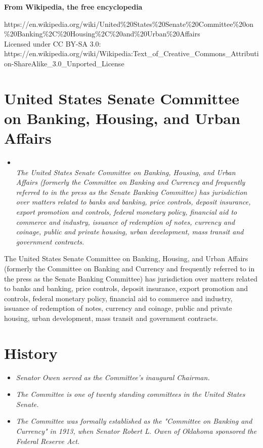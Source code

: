 \textbf{From Wikipedia, the free encyclopedia}

https://en.wikipedia.org/wiki/United\%20States\%20Senate\%20Committee\%20on\%20Banking\%2C\%20Housing\%2C\%20and\%20Urban\%20Affairs\\
Licensed under CC BY-SA 3.0:\\
https://en.wikipedia.org/wiki/Wikipedia:Text\_of\_Creative\_Commons\_Attribution-ShareAlike\_3.0\_Unported\_License

\section{United States Senate Committee on Banking, Housing, and Urban
Affairs}\label{united-states-senate-committee-on-banking-housing-and-urban-affairs}

\begin{itemize}
\item
  \emph{\\
  The United States Senate Committee on Banking, Housing, and Urban
  Affairs (formerly the Committee on Banking and Currency and frequently
  referred to in the press as the Senate Banking Committee) has
  jurisdiction over matters related to banks and banking, price
  controls, deposit insurance, export promotion and controls, federal
  monetary policy, financial aid to commerce and industry, issuance of
  redemption of notes, currency and coinage, public and private housing,
  urban development, mass transit and government contracts.}
\end{itemize}

The United States Senate Committee on Banking, Housing, and Urban
Affairs (formerly the Committee on Banking and Currency and frequently
referred to in the press as the Senate Banking Committee) has
jurisdiction over matters related to banks and banking, price controls,
deposit insurance, export promotion and controls, federal monetary
policy, financial aid to commerce and industry, issuance of redemption
of notes, currency and coinage, public and private housing, urban
development, mass transit and government contracts.

\section{History}\label{history}

\begin{itemize}
\item
  \emph{Senator Owen served as the Committee's inaugural Chairman.}
\item
  \emph{The Committee is one of twenty standing committees in the United
  States Senate.}
\item
  \emph{The Committee was formally established as the "Committee on
  Banking and Currency" in 1913, when Senator Robert L. Owen of Oklahoma
  sponsored the Federal Reserve Act.}
\end{itemize}

